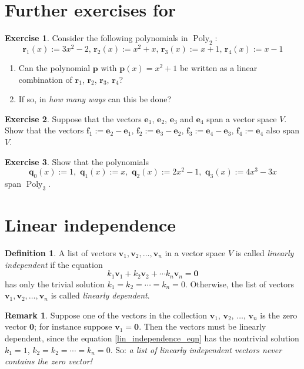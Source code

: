 \documentclass[a4paper,11pt]{book}
\theoremstyle{definition}
\newtheorem{definition}[theorem]{Definition}
\newtheorem{exercise}{Exercise}
\newtheorem{remark}[theorem]{Remark}
\newcommand{\be}{\begin{equation}}
\newcommand{\ee}{\end{equation}}
\newcommand{\ve}[1]{\mathbf{#1}}
\newcommand{\furtherexercises}{\section*{Further exercises for \thesection}}
\DeclareMathOperator{\Poly}{Poly}
\begin{document}
\furtherexercises
\begin{exercise} Consider the following polynomials in $\Poly_2$:
\[
 \ve{r}_1 (x) := 3x^2 - 2, \, \ve{r}_2 (x) := x^2 + x, \, \ve{r}_3 (x) := x + 1, \, \ve{r}_4 (x) := x-1
\]
\begin{enumerate}
 \item Can the polynomial $\ve{p}$ with $\ve{p}(x) = x^2 + 1$ be written as a linear combination of $\ve{r}_1$, $\ve{r}_2$, $\ve{r}_3$, $\ve{r}_4$?
 \item If so, in {\em how many ways} can this be done?
\end{enumerate}
\end{exercise}

\begin{exercise} Suppose that the vectors $\ve{e}_1$, $\ve{e}_2$, $\ve{e}_3$ and $\ve{e}_4$ span a vector space $V$. Show that the vectors $\ve{f}_1 := \ve{e}_2 - \ve{e}_1$, $\ve{f}_2 := \ve{e}_3 - \ve{e}_2$, $\ve{f}_3 := \ve{e}_4 - \ve{e}_3$, $\ve{f}_4 := \ve{e}_4$ also span $V$. 
\end{exercise}

\begin{exercise} Show that the polynomials \label{chebyshev_example}
\[
\ve{q}_0 (x) := 1, \,\, \ve{q}_1 (x):= x, \,\, \ve{q}_2(x) := 2x^2 - 1, \,\, \ve{q}_3(x) := 4x^3 - 3x
\]
span $\Poly_3$.
\end{exercise}

\section{Linear independence} \label{Ch2Sec2LinearIndependence}

\begin{definition} A list of vectors $\ve{v}_1, \ve{v}_2, \ldots, \ve{v}_n$ in a vector space $V$ is called {\em linearly independent} if the equation
\be \label{lin_independence_eqn}
  k_1 \ve{v}_1 + k_2 \ve{v}_2 + \cdots k_n \ve{v}_n = \ve{0}
\ee
has only the trivial solution $k_1 = k_2 = \cdots = k_n = 0$. Otherwise, the list of vectors $\ve{v}_1, \ve{v}_2, \ldots, \ve{v}_n$ is called {\em linearly dependent}. 
\end{definition}


\begin{remark} Suppose one of the vectors in the collection $\ve{v}_1$, $\ve{v}_2$, $\ldots$, $\ve{v}_n$ is the zero vector $\ve{0}$; for instance suppose $\ve{v}_1 = \ve{0}$. Then the vectors must be linearly dependent, since the equation \eqref{lin_independence_eqn} has the nontrivial solution $k_1 = 1$, $k_2 = k_2 = \cdots = k_n = 0$. So: {\em a list of linearly independent vectors never contains the zero vector!} \label{remark_about_lin_dependence}
\end{remark}
\end{document}
